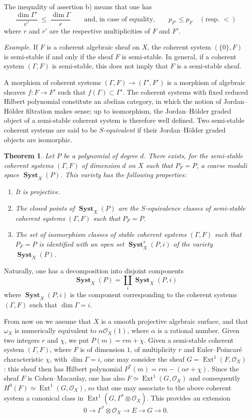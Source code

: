 \documentclass[12pt,english]{smfart}%
\theoremstyle{plain}
\newtheorem{theorem}{Theorem}[section]
\theoremstyle{definition}
\theoremstyle{remark}
\newcommand{\Oo}{\mathcal{O}}
\DeclareMathOperator{\Ext}{Ext}
\DeclareMathOperator{\Syst}{\mathbf{Syst}}
\newcommand{\origpage}[1]{\marginnote{\scriptsize\itshape p.~#1}}
\begin{document}
\origpage{673}%
The inequality of assertion b) means that one has
\[
\frac{\dim\Gamma'}{r'}\;\le\;\frac{\dim\Gamma}{r}
\qquad\text{and, in case of equality,}\qquad
p_{F'}\le p_F \quad(\text{resp.\ }<)
\]
where $r$ and $r'$ are the respective multiplicities of $F$ and $F'$.

\medskip
\noindent\emph{Example.} If $F$ is a coherent algebraic sheaf on $X$, the coherent system $(\{0\},F)$ is semi-stable if and only if the sheaf $F$ is semi-stable. In general, if a coherent system $(\Gamma,F)$ is semi-stable, this does not imply that $F$ is a semi-stable sheaf.
\medskip

A morphism of coherent systems $(\Gamma,F)\to(\Gamma',F')$ is a morphism of algebraic sheaves $f:F\to F'$ such that $f(\Gamma)\subset\Gamma'$. The coherent systems with fixed reduced Hilbert polynomial constitute an abelian category, in which the notion of Jordan--H\"older filtration makes sense; up to isomorphism, the Jordan--H\"older graded object of a semi-stable coherent system is therefore well defined. Two semi-stable coherent systems are said to be \emph{$S$-equivalent} if their Jordan--H\"older graded objects are isomorphic.

\begin{theorem}\label{thm:syst}
Let $P$ be a polynomial of degree $d$. There exists, for the semi-stable coherent systems $(\Gamma,F)$ of dimension $d$ on $X$ such that $P_F=P$, a coarse moduli space $\Syst_X(P)$. This variety has the following properties:
\begin{enumerate}
\item It is projective.
\item The closed points of $\Syst_X(P)$ are the $S$-equivalence classes of semi-stable coherent systems $(\Gamma,F)$ such that $P_F=P$.
\item The set of isomorphism classes of stable coherent systems $(\Gamma,F)$ such that $P_F=P$ is identified with an open set $\Syst^s_X(P,i)$ of the variety $\Syst_X(P)$.
\end{enumerate}
\end{theorem}

Naturally, one has a decomposition into disjoint components
\[
\Syst_X(P)=\coprod_i \Syst_X(P,i)
\]
where $\Syst_X(P,i)$ is the component corresponding to the coherent systems $(\Gamma,F)$ such that $\dim\Gamma = i$.

From now on we assume that $X$ is a smooth projective algebraic surface, and that $\omega_X$ is numerically equivalent to $\alpha\Oo_X(1)$, where $\alpha$ is a rational number. Given two integers $r$ and $\chi$, we put $P(m)=rm+\chi$. Given a semi-stable coherent system $(\Gamma,F)$, where $F$ is of dimension $1$, of multiplicity $r$ and Euler--Poincar\'e characteristic $\chi$, with $\dim\Gamma=i$, one may consider the sheaf $G=\Ext^1(F,\Oo_X)$: this sheaf then has Hilbert polynomial $P^{*}(m)=rm-(\alpha r+\chi)$. Since the sheaf $F$ is Cohen--Macaulay, one has also $F\simeq \Ext^1(G,\Oo_X)$ and consequently $H^0(F)\simeq \Ext^1(G,\Oo_X)$, so that one may associate to the above coherent system a canonical class in $\Ext^1(G,\Gamma^{*}\otimes\Oo_X)$. This provides an extension
\[
0\longrightarrow \Gamma^{*}\otimes\Oo_X\longrightarrow E\longrightarrow G
\longrightarrow 0 .
\]
\end{document}
